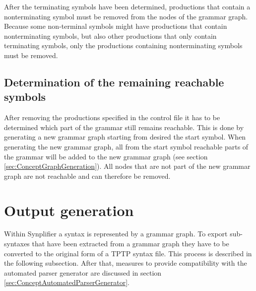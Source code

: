 After the terminating symbols have been determined, productions that contain a nonterminating symbol must be removed from the nodes of the grammar graph. Because some non-terminal symbols might have productions that contain nonterminating symbols, but also other productions that only contain terminating symbols, only the productions containing nonterminating symbols must be removed.

%

\subsection{Determination of the remaining reachable symbols}\label{sec:ConceptDerterminingRemainingReachable}
After removing the productions specified in the control file it has to be determined which part of the grammar still remains reachable.
This is done by generating a new grammar graph starting from desired the start symbol.
When generating the new grammar graph, all from the start symbol reachable parts of the grammar will be added to the new grammar graph (see section \ref{sec:ConceptGraphGeneration}).
All nodes that are not part of the new grammar graph are not reachable and can therefore be removed.

\section{Output generation}\label{sec:ConceptOutputGeneration}
Within \ac{Synplifier} a syntax is represented by a grammar graph.
To export sub-syntaxes that have been extracted from a grammar graph they have to be converted to the original form of a \ac{TPTP} syntax file. This process is described in the following subsection.
After that, measures to provide compatibility with the automated parser generator are discussed in section \ref{sec:ConceptAutomatedParserGenerator}.


